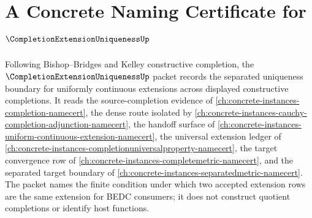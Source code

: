 \chapter{A Concrete Naming Certificate for $\CompletionExtensionUniquenessUp$}
\label{ch:concrete-instances-completion-extension-uniqueness-namecert}

Following Bishop--Bridges and Kelley constructive completion, the $\CompletionExtensionUniquenessUp$ packet records the separated uniqueness boundary for uniformly continuous extensions across displayed constructive completions. It reads the source-completion evidence of \autoref{ch:concrete-instances-completion-namecert}, the dense route isolated by \autoref{ch:concrete-instances-cauchy-completion-adjunction-namecert}, the handoff surface of \autoref{ch:concrete-instances-uniform-continuous-extension-namecert}, the universal extension ledger of \autoref{ch:concrete-instances-completionuniversalproperty-namecert}, the target convergence row of \autoref{ch:concrete-instances-completemetric-namecert}, and the separated target boundary of \autoref{ch:concrete-instances-separatedmetric-namecert}. The packet names the finite condition under which two accepted extension rows are the same extension for BEDC consumers; it does not construct quotient completions or identify host functions.

